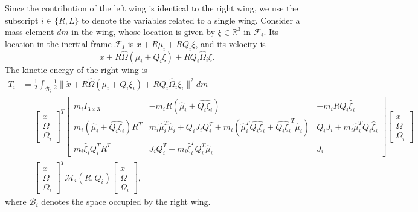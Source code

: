 \documentclass[10pt]{article}
\renewcommand{\Re}{\ensuremath{\mathbb{R}}}
\begin{document}
Since the contribution of the left wing is identical to the right wing, we use the subscript $i\in\{R,L\}$ to denote the variables related to a single wing. 
Consider a mass element $dm$ in the wing, whose location is given by $\xi\in\Re^3$ in $\mathcal{F}_i$. 
Its location in the inertial frame $\mathcal{F}_I$ is $x + R\mu_i + R Q_i \xi$, and its velocity is 
\[
    \dot x + R\hat \Omega (\mu_i + Q_i\xi ) + R Q_i \hat\Omega_i \xi.
\]
The kinetic energy of the right wing is 
\begin{align*}
    T_i & = \frac{1}{2} \int_{\mathcal{B}_i} \frac{1}{2} \|\dot x + R\hat \Omega (\mu_i + Q_i\xi_i ) + R Q_i \hat\Omega_i \xi_i \|^2 dm\\
        & = \begin{bmatrix} \dot x \\ \Omega \\ \Omega_i \end{bmatrix}^T
    \begin{bmatrix}
        m_i I_{3\times 3} & -m_i R(\hat \mu_i + \widehat{Q_i\xi_i}) & - m_i R Q_i \hat \xi_i \\
        m_i (\hat \mu_i + \widehat{Q_i\xi_i}) R^T & m_i \hat\mu_i^T\hat\mu_i + Q_i J_i Q_i^T + m_i (\hat \mu_i^T \widehat{Q_i\xi_i} + \widehat{Q_i\xi_i}^T \hat\mu_i ) & Q_i J_i + m_i \hat\mu_i^T Q_i \hat\xi_i \\
        m_i\hat\xi_i Q_i^T R^T & J_i Q_i^T + m_i \hat\xi_i^T Q_i^T \hat\mu_i & J_i 
    \end{bmatrix}
    \begin{bmatrix} \dot x \\ \Omega \\ \Omega_i \end{bmatrix}\\
        & = \begin{bmatrix} \dot x \\ \Omega \\ \Omega_i \end{bmatrix}^T
    \mathcal{M}_i (R, Q_i) 
    \begin{bmatrix} \dot x \\ \Omega \\ \Omega_i \end{bmatrix},
\end{align*}
where $\mathcal{B}_i$ denotes the space occupied by the right wing.
\end{document}
